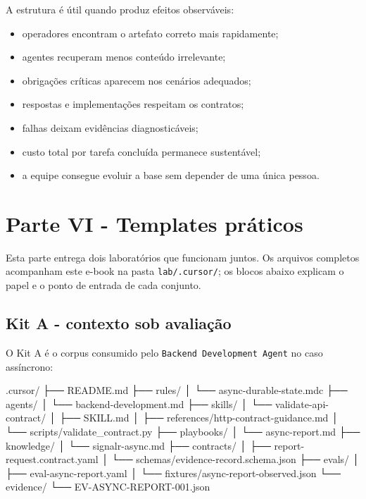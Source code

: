 \documentclass[
  10pt,
  a4paper,
  oneside]{book}
\newenvironment{Shaded}{}{}
\newcommand{\NormalTok}[1]{#1}
\providecommand{\tightlist}{%
  \setlength{\itemsep}{0pt}\setlength{\parskip}{0pt}}
\begin{document}
A estrutura é útil quando produz efeitos observáveis:

\begin{itemize}
\tightlist
\item
  operadores encontram o artefato correto mais rapidamente;
\item
  agentes recuperam menos conteúdo irrelevante;
\item
  obrigações críticas aparecem nos cenários adequados;
\item
  respostas e implementações respeitam os contratos;
\item
  falhas deixam evidências diagnosticáveis;
\item
  custo total por tarefa concluída permanece sustentável;
\item
  a equipe consegue evoluir a base sem depender de uma única pessoa.
\end{itemize}

\newpage

\hypertarget{parte-vi---templates-pruxe1ticos}{%
\chapter{Parte VI - Templates
práticos}\label{parte-vi---templates-pruxe1ticos}}

Esta parte entrega dois laboratórios que funcionam juntos. Os arquivos
completos acompanham este e-book na pasta \texttt{lab/.cursor/}; os
blocos abaixo explicam o papel e o ponto de entrada de cada conjunto.

\hypertarget{kit-a---contexto-sob-avaliauxe7uxe3o}{%
\section{Kit A - contexto sob
avaliação}\label{kit-a---contexto-sob-avaliauxe7uxe3o}}

O Kit A é o corpus consumido pelo \texttt{Backend\ Development\ Agent}
no caso assíncrono:

\begin{Shaded}
\begin{Highlighting}[]
\NormalTok{.cursor/}
\NormalTok{├── README.md}
\NormalTok{├── rules/}
\NormalTok{│   └── async{-}durable{-}state.mdc}
\NormalTok{├── agents/}
\NormalTok{│   └── backend{-}development.md}
\NormalTok{├── skills/}
\NormalTok{│   └── validate{-}api{-}contract/}
\NormalTok{│       ├── SKILL.md}
\NormalTok{│       ├── references/http{-}contract{-}guidance.md}
\NormalTok{│       └── scripts/validate\_contract.py}
\NormalTok{├── playbooks/}
\NormalTok{│   └── async{-}report.md}
\NormalTok{├── knowledge/}
\NormalTok{│   └── signalr{-}async.md}
\NormalTok{├── contracts/}
\NormalTok{│   ├── report{-}request.contract.yaml}
\NormalTok{│   └── schemas/evidence{-}record.schema.json}
\NormalTok{├── evals/}
\NormalTok{│   ├── eval{-}async{-}report.yaml}
\NormalTok{│   └── fixtures/async{-}report{-}observed.json}
\NormalTok{└── evidence/}
\NormalTok{    └── EV{-}ASYNC{-}REPORT{-}001.json}
\end{Highlighting}
\end{Shaded}
\end{document}

